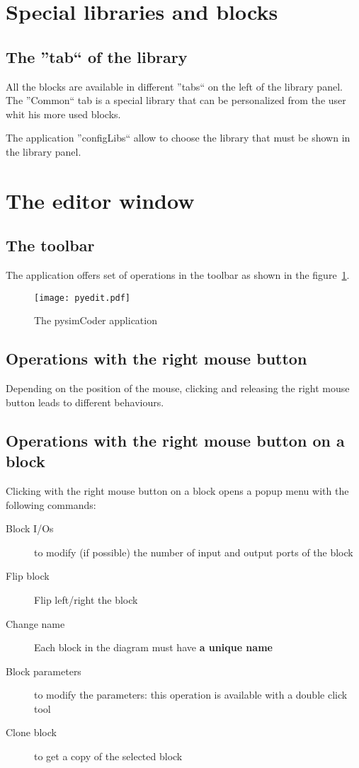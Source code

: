 \section{Special libraries and blocks}

\subsection{The ''tab`` of the library}

All the blocks are available in different ''tabs`` on the left of the library panel. The ''Common`` tab is a special library that can be personalized from the user whit his more used blocks.

The application ''configLibs`` allow to choose the library that must be shown in the library panel.

\section{The editor window}

\subsection{The toolbar}

The application offers  set of operations in the toolbar as shown in the 
figure~\ref{Fig:pysimCoder}.

\begin{figure}[htbp]
 \centering
 \texttt{[image: pyedit.pdf]}
 \caption{The pysimCoder application}
 \label{Fig:pysimCoder}
 \end{figure}

\subsection{Operations with the right mouse button}
Depending on the position of the mouse, clicking and releasing the right mouse 
button leads to different behaviours.

\subsection{Operations with the right mouse button on a block}

Clicking with the right mouse button on a block opens a popup menu with the 
following commands:

\begin{description}
\item [Block I/Os] to modify (if possible) the number of input and output ports 
of the block
\item [Flip block] Flip left/right the block
\item [Change name] Each block in the diagram must have \textbf{a unique name}
\item [Block parameters] to modify the parameters: this operation is available 
with a double click tool
\item [Clone block] to get a copy of the selected block
\end{description}

